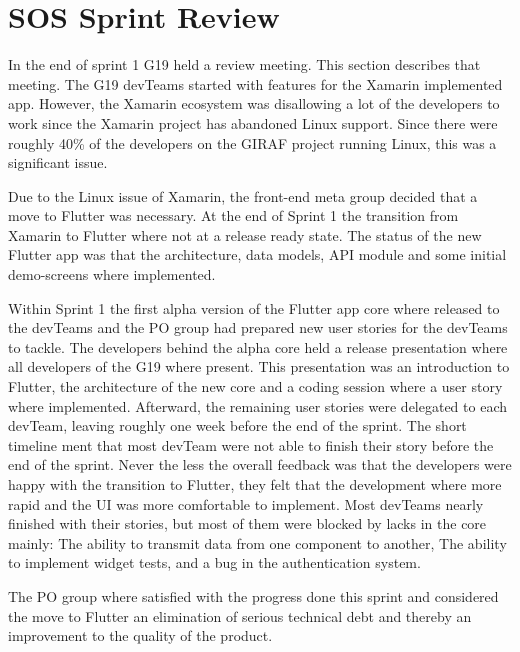 \section{SOS Sprint Review}
In the end of sprint 1 \gls{G19} held a review meeting. This section describes that meeting.
The \gls{G19} \glspl{devTeam} started with features for the Xamarin implemented app. However, the Xamarin ecosystem was disallowing a lot of the developers to work since the Xamarin project has abandoned Linux support. Since there were roughly 40\% of the developers on the GIRAF project running Linux, this was a significant issue.

Due to the Linux issue of Xamarin, the front-end meta group decided that a move to Flutter was necessary. At the end of Sprint 1 the transition from Xamarin to Flutter where not at a release ready state. The status of the new Flutter app was that the architecture, data models, API module and some initial demo-screens where implemented.

Within Sprint 1 the first alpha version of the Flutter app core where released to the \glspl{devTeam} and the \gls{PO} group had prepared new user stories for the \glspl{devTeam} to tackle. The developers behind the alpha core held a release presentation where all developers of the \gls{G19} where present. This presentation was an introduction to Flutter, the architecture of the new core and a coding session where a user story where implemented. Afterward, the remaining user stories were delegated to each \gls{devTeam}, leaving roughly one week before the end of the sprint. The short timeline ment that most \gls{devTeam} were not  able to finish their story before the end of the sprint. Never the less the overall feedback was that the developers were happy with the transition to Flutter, they felt that the development where more rapid and the UI was more comfortable to implement. Most \glspl{devTeam} nearly finished with their stories, but most of them were blocked by lacks in the core mainly: The ability to transmit data from one component to another, The ability to implement widget tests, and a bug in the authentication system.

The \gls{PO} group where satisfied with the progress done this sprint and considered the move to Flutter an elimination of serious technical debt and thereby an improvement to the quality of the product.
